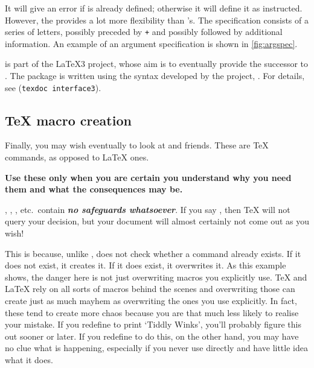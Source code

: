 It will give an error if  is already defined; otherwise it will define it as instructed.
However, the  provides a lot more flexibility than 's.
The specification consists of a series of letters, possibly preceded by \verb|+| and possibly followed by additional information.
An example of an argument specification is shown in \cref{fig:argspec}.

 is part of the \LaTeX 3 project, whose aim is to eventually provide the successor to \LaTeXe.
The package is written using the syntax developed by the project, .
For details, see  (\verb|texdoc interface3|).


\subsection{\TeX{} macro creation}\label{subsec:tex}


Finally, you may wish eventually to look at  and friends.
These are \TeX{} commands, as opposed to \LaTeX{} ones.

\textbf{Use these only when you are certain you understand why you need them and what the consequences may be.}

, , ,  etc.\ contain \emph{\bfseries no safeguards whatsoever}.
If you say , then \TeX{} will not query your decision, but your document will almost certainly not come out as you wish!

This is because, unlike ,  does not check whether a command already exists.
If it does not exist, it creates it.
If it does exist, it overwrites it.
As this example shows, the danger here is not just overwriting macros you explicitly use.
\TeX{} and \LaTeX{} rely on all sorts of macros behind the scenes and overwriting those can create just as much mayhem as overwriting the ones you use explicitly.
In fact, these tend to create more chaos because you are that much less likely to realise your mistake.
If you redefine  to print ‘Tiddly Winks’, you'll probably figure this out sooner or later.
If you redefine  to do this, on the other hand, you may have no clue what is happening, especially if you never use  directly and have little idea what it does.

\begin{center}
  \LARGE{}
\end{center}





